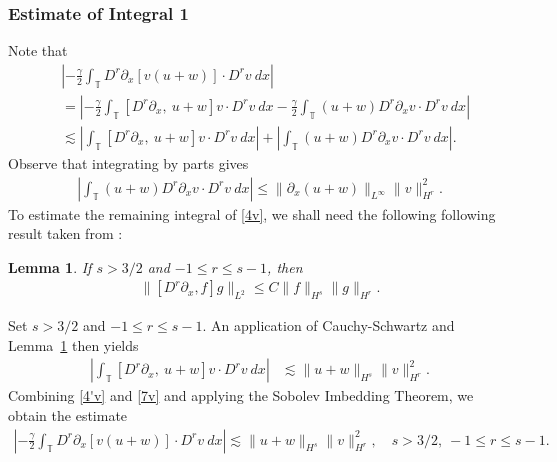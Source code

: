 \documentclass[12pt,reqno]{amsart}
\numberwithin{equation}{section}  %
\numberwithin{figure}{section}
\newcommand{\ci}{\mathbb{T}}
\newcommand{\p}{\partial}
\newtheorem{lemma}[theorem]{Lemma}
\begin{document}
\subsubsection{Estimate of Integral 1} Note that
%
%
\begin{equation}
\begin{split}
& \left |  -\frac{\gamma}{2} \int_{\ci} D^r \p_x [v(u+w)] \cdot
D^r v \ dx \right |
\\
& =
\left |
-\frac{\gamma}{2} \int_{\ci} \left[ D^r \p_x, \ u+w \right]v \cdot
D^r v \ dx - \frac{\gamma}{2} \int_{\ci} (u+w) D^r
\p_x v \cdot D^r v\ dx
\right | \\
& \lesssim \left |
\int_{\ci} \left[ D^r \p_x, \ u+w \right]v \cdot
D^r v \ dx \right |
+ \left | \int_{\ci} (u+w) D^r \p_x v
\cdot D^r v\
dx \right |.
\label{4v}
\end{split}
\end{equation}
%
%
Observe that integrating by parts gives
%
%
\begin{equation}
\begin{split}
\left | \int_{\ci} (u+w) D^r \p_x v \cdot
D^r v \ dx \right |
\le \|\p_x (u+w)\|_{L^\infty}
\|v\|_{H^r}^2.
\label{4'v}
\end{split}
\end{equation}
%
%
%
%
To estimate the remaining integral of \eqref{4v}, we shall need the following
following result taken from \cite{Himonas_2009_Non-uniform-dep-per}:
%
\begin{lemma}
\label{cor1}
If $s > 3/2$ and $-1 \le r  \le s -1$, then
%
%
\begin{equation}
\begin{split}
\|[D^r \p_x ,f]g\|_{L^2} \le C \|f\|_{H^s} \|g\|_{H^r}.
\label{15}
\end{split}
\end{equation}
%
%
\end{lemma}
%
%
Set $s > 3/2$ and $-1 \le r \le s -1$. An application of 
Cauchy-Schwartz and Lemma~\ref{cor1} then yields 
%
%
\begin{equation}
\begin{split}
 \left | \int_{\ci} [D^r \p_x, \ u+w] v
\cdot D^r v \ dx \right |
& \lesssim \|u+w\|_{H^s} 
\|v\|_{H^r}^2.
\label{7v}
\end{split}
\end{equation}
%
%
Combining \eqref{4'v} and \eqref{7v} and applying the Sobolev Imbedding 
Theorem, we obtain the estimate
%
%
\begin{equation}
\begin{split}
\left |  -\frac{\gamma}{2} \int_{\ci} D^r \p_x [v(u+w)] \cdot
D^r v \ dx \right |
 \lesssim \|u+w\|_{H^s} \|v\|_{H^r}^2, \quad s > 3/2, \ -1 \le r \le s-1.
\label{8v}
\end{split}
\end{equation}
%
%
\end{document}
